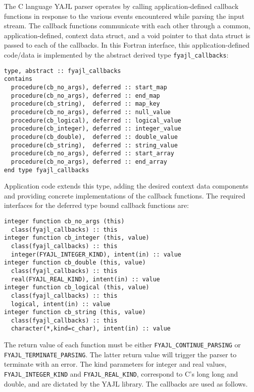 \documentclass[11pt]{article}
\begin{document}
The C language YAJL parser operates by calling application-defined callback
functions in response to the various events encountered while parsing the
input stream.  The callback functions communicate with each other through
a common, application-defined, context data struct, and a void pointer to
that data struct is passed to each of the callbacks.  In this Fortran
interface, this application-defined code/data is implemented by the abstract
derived type \texttt{fyajl_callbacks}:
\begin{verbatim}
type, abstract :: fyajl_callbacks
contains
  procedure(cb_no_args), deferred :: start_map
  procedure(cb_no_args), deferred :: end_map
  procedure(cb_string),  deferred :: map_key
  procedure(cb_no_args), deferred :: null_value
  procedure(cb_logical), deferred :: logical_value
  procedure(cb_integer), deferred :: integer_value
  procedure(cb_double),  deferred :: double_value
  procedure(cb_string),  deferred :: string_value
  procedure(cb_no_args), deferred :: start_array
  procedure(cb_no_args), deferred :: end_array
end type fyajl_callbacks
\end{verbatim}
Application code extends this type, adding the desired context data
components and providing concrete implementations of the callback functions.
The required interfaces for the deferred type bound callback functions are:
\begin{verbatim}
integer function cb_no_args (this)
  class(fyajl_callbacks) :: this
integer function cb_integer (this, value)
  class(fyajl_callbacks) :: this
  integer(FYAJL_INTEGER_KIND), intent(in) :: value
integer function cb_double (this, value)
  class(fyajl_callbacks) :: this
  real(FYAJL_REAL_KIND), intent(in) :: value
integer function cb_logical (this, value)
  class(fyajl_callbacks) :: this
  logical, intent(in) :: value
integer function cb_string (this, value)
  class(fyajl_callbacks) :: this
  character(*,kind=c_char), intent(in) :: value
\end{verbatim}
The return value of each function must be either
\texttt{FYAJL_CONTINUE_PARSING} or \texttt{FYAJL_TERMINATE_PARSING}.
The latter return value will trigger the parser to terminate with an error.
The kind parameters for integer and real values, \texttt{FYAJL_INTEGER_KIND}
and \texttt{FYAJL_REAL_KIND}, correspond to C's long long and double, and
are dictated by the YAJL library.  The callbacks are used as follows.
\end{document}
